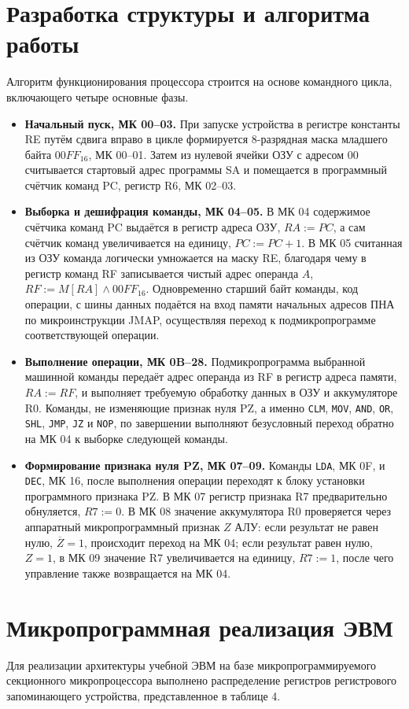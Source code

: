 \documentclass[11pt, a4paper]{article}
\begin{document}
\section{Разработка структуры и алгоритма работы}
Алгоритм функционирования процессора строится на основе командного цикла, включающего четыре основные фазы.
\begin{itemize}
	\item \textbf{Начальный пуск, МК 00--03.} При запуске устройства в регистре константы RE путём сдвига вправо в цикле формируется 8-разрядная маска младшего байта $00FF_{16}$, МК 00--01. Затем из нулевой ячейки ОЗУ с адресом 00 считывается стартовый адрес программы SA и помещается в программный счётчик команд PC, регистр R6, МК 02--03.
	\item \textbf{Выборка и дешифрация команды, МК 04--05.} В МК 04 содержимое счётчика команд PC выдаётся в регистр адреса ОЗУ, $RA := PC$, а сам счётчик команд увеличивается на единицу, $PC := PC + 1$. В МК 05 считанная из ОЗУ команда логически умножается на маску RE, благодаря чему в регистр команд RF записывается чистый адрес операнда $A$, $RF := M[RA] \wedge 00FF_{16}$. Одновременно старший байт команды, код операции, с шины данных подаётся на вход памяти начальных адресов ПНА по микроинструкции JMAP, осуществляя переход к подмикропрограмме соответствующей операции.
	\item \textbf{Выполнение операции, МК 0B--28.} Подмикропрограмма выбранной машинной команды передаёт адрес операнда из RF в регистр адреса памяти, $RA := RF$, и выполняет требуемую обработку данных в ОЗУ и аккумуляторе R0. Команды, не изменяющие признак нуля PZ, а именно \texttt{CLM}, \texttt{MOV}, \texttt{AND}, \texttt{OR}, \texttt{SHL}, \texttt{JMP}, \texttt{JZ} и \texttt{NOP}, по завершении выполняют безусловный переход обратно на МК 04 к выборке следующей команды.
	\item \textbf{Формирование признака нуля PZ, МК 07--09.} Команды \texttt{LDA}, МК 0F, и \texttt{DEC}, МК 16, после выполнения операции переходят к блоку установки программного признака PZ. В МК 07 регистр признака R7 предварительно обнуляется, $R7 := 0$. В МК 08 значение аккумулятора R0 проверяется через аппаратный микропрограммный признак $Z$ АЛУ: если результат не равен нулю, $\overline{Z} = 1$, происходит переход на МК 04; если результат равен нулю, $Z = 1$, в МК 09 значение R7 увеличивается на единицу, $R7 := 1$, после чего управление также возвращается на МК 04.
\end{itemize}

\section{Микропрограммная реализация ЭВМ}
Для реализации архитектуры учебной ЭВМ на базе микропрограммируемого секционного микропроцессора выполнено распределение регистров регистрового запоминающего устройства, представленное в таблице 4.
\end{document}
